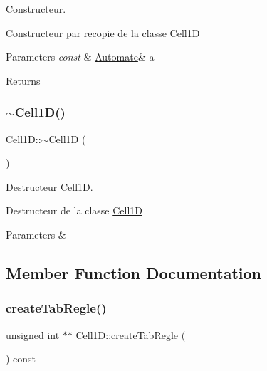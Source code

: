 Constructeur. 

Constructeur par recopie de la classe \mbox{\hyperlink{class_cell1_d}{Cell1D}}


\begin{DoxyParams}{Parameters}
{\em const} & \mbox{\hyperlink{class_automate}{Automate}}\& a \\
\hline
\end{DoxyParams}
\begin{DoxyReturn}{Returns}

\end{DoxyReturn}
\mbox{\label{class_cell1_d_a42c2d4e7a54430f75eb69eca13c2dbd6}} 
\subsubsection{\texorpdfstring{$\sim$\+Cell1\+D()}{~Cell1D()}}
{\footnotesize\ttfamily Cell1\+D\+::$\sim$\+Cell1D (\begin{DoxyParamCaption}{ }\end{DoxyParamCaption})}



Destructeur \mbox{\hyperlink{class_cell1_d}{Cell1D}}. 

Destructeur de la classe \mbox{\hyperlink{class_cell1_d}{Cell1D}}


\begin{DoxyParams}{Parameters}
{\em } & \\
\hline
\end{DoxyParams}


\subsection{Member Function Documentation}
\mbox{\label{class_cell1_d_aa19cf29a243066c0883c1c984ee55afe}} 
\subsubsection{\texorpdfstring{create\+Tab\+Regle()}{createTabRegle()}}
{\footnotesize\ttfamily unsigned int $\ast$$\ast$ Cell1\+D\+::create\+Tab\+Regle (\begin{DoxyParamCaption}{ }\end{DoxyParamCaption}) const\hspace{0.3cm}{\ttfamily [virtual]}}



